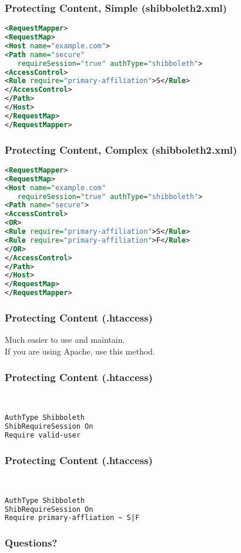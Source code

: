 \documentclass[hyperref={colorlinks=true},professionalfonts]{beamer}
\begin{document}
\begin{frame}[fragile]
\frametitle{Protecting Content, Simple (shibboleth2.xml)}
\begin{lstlisting}[language=XML,basicstyle=\ttfamily \small]
<RequestMapper>
<RequestMap>
<Host name="example.com">
<Path name="secure" 
   requireSession="true" authType="shibboleth">
<AccessControl>
<Rule require="primary-affiliation">S</Rule>
</AccessControl>
</Path>
</Host>
</RequestMap>
</RequestMapper>
\end{lstlisting}

\end{frame}

\begin{frame}[fragile]
\frametitle{Protecting Content, Complex (shibboleth2.xml)}
\begin{lstlisting}[language=XML,basicstyle=\ttfamily \small]
<RequestMapper>
<RequestMap>
<Host name="example.com" 
   requireSession="true" authType="shibboleth">
<Path name="secure">
<AccessControl>
<OR>
<Rule require="primary-affiliation">S</Rule>
<Rule require="primary-affiliation">F</Rule>
</OR>
</AccessControl>
</Path>
</Host>
</RequestMap>
</RequestMapper>
\end{lstlisting}

\end{frame}

\begin{frame}
\frametitle{Protecting Content (.htaccess)}
Much easier to use and maintain. \\ \bigskip
If you are using Apache, use this method.
\end{frame}

\begin{frame}[fragile]
\frametitle{Protecting Content (.htaccess)}
 \\
\begin{lstlisting}[language=XML,basicstyle=\ttfamily \small]
AuthType Shibboleth
ShibRequireSession On
Require valid-user
\end{lstlisting}
\end{frame}

\begin{frame}[fragile]
\frametitle{Protecting Content (.htaccess)}
 \\
\begin{lstlisting}[language=XML,basicstyle=\ttfamily \small]
AuthType Shibboleth
ShibRequireSession On
Require primary-affliation ~ S|F
\end{lstlisting}
\end{frame}

\begin{frame}
\frametitle{Questions?}
\end{frame}
\end{document}
